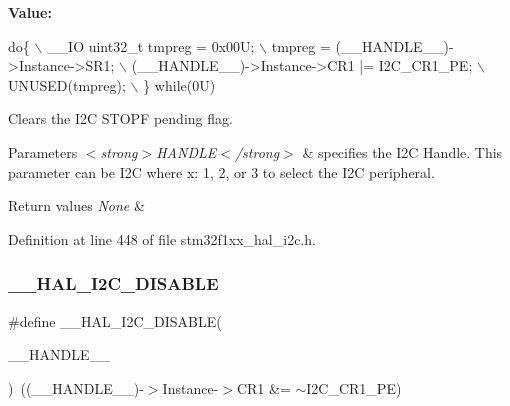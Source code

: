 {\bfseries Value\+:}
\begin{DoxyCode}
\textcolor{keywordflow}{do}\{                                           \(\backslash\)
    \_\_IO uint32\_t tmpreg = 0x00U;               \(\backslash\)
    tmpreg = (\_\_HANDLE\_\_)->Instance->SR1;       \(\backslash\)
    (\_\_HANDLE\_\_)->Instance->CR1 |= I2C\_CR1\_PE;  \(\backslash\)
    UNUSED(tmpreg);                             \(\backslash\)
  \} \textcolor{keywordflow}{while}(0U)
\end{DoxyCode}


Clears the I2C S\+T\+O\+PF pending flag. 


\begin{DoxyParams}{Parameters}
{\em $<$strong$>$\+H\+A\+N\+D\+L\+E$<$/strong$>$} & specifies the I2C Handle. This parameter can be I2C where x\+: 1, 2, or 3 to select the I2C peripheral. \\
\hline
\end{DoxyParams}

\begin{DoxyRetVals}{Return values}
{\em None} & \\
\hline
\end{DoxyRetVals}


Definition at line 448 of file stm32f1xx\+\_\+hal\+\_\+i2c.\+h.

\mbox{\label{group___i2_c___exported___macros_ga3d6a35da02ca72537a15570912c80412}} 
\subsubsection{\texorpdfstring{\+\_\+\+\_\+\+H\+A\+L\+\_\+\+I2\+C\+\_\+\+D\+I\+S\+A\+B\+LE}{\_\_HAL\_I2C\_DISABLE}}
{\footnotesize\ttfamily \#define \+\_\+\+\_\+\+H\+A\+L\+\_\+\+I2\+C\+\_\+\+D\+I\+S\+A\+B\+LE(\begin{DoxyParamCaption}\item[{}]{\+\_\+\+\_\+\+H\+A\+N\+D\+L\+E\+\_\+\+\_\+ }\end{DoxyParamCaption})~((\+\_\+\+\_\+\+H\+A\+N\+D\+L\+E\+\_\+\+\_\+)-\/$>$Instance-\/$>$C\+R1 \&=  $\sim$I2\+C\+\_\+\+C\+R1\+\_\+\+PE)}




